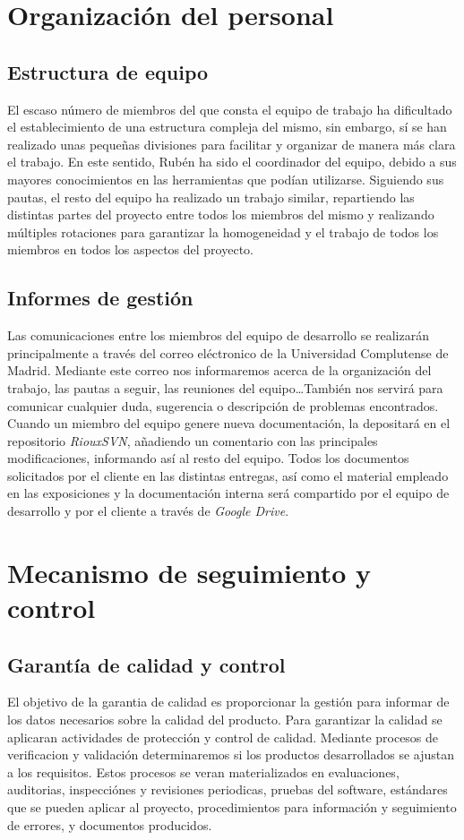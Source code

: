 \documentclass[11pt, a4paper, twoside]{report}
\begin{document}
	\section{Organización del personal}
		\subsection{Estructura de equipo}	%
		El escaso número de miembros del que consta el equipo de trabajo ha dificultado el establecimiento de una estructura compleja del mismo, sin embargo, sí se han realizado unas pequeñas divisiones para facilitar y organizar de manera más clara el trabajo. En este sentido, Rubén ha sido el coordinador del equipo, debido a sus mayores conocimientos en las herramientas que podían utilizarse. Siguiendo sus pautas, el resto del equipo ha realizado un trabajo similar, repartiendo las distintas partes del proyecto entre todos los miembros del mismo y realizando múltiples rotaciones para garantizar la homogeneidad y el trabajo de todos los miembros en todos los aspectos del proyecto.
		\subsection{Informes de gestión}
		Las comunicaciones entre los miembros del equipo de desarrollo se realizarán principalmente a través del correo eléctronico de la Universidad Complutense de Madrid. Mediante este correo nos informaremos acerca de la organización del trabajo, las pautas a seguir, las reuniones del equipo\ldots También nos servirá para comunicar cualquier duda, sugerencia o descripción de problemas encontrados. \\
		Cuando un miembro del equipo genere nueva documentación, la depositará en el repositorio \textit{RiouxSVN}, añadiendo un comentario con las principales modificaciones, informando así al resto del equipo. Todos los documentos solicitados por el cliente en las distintas entregas, así como el material empleado en las exposiciones y la documentación interna será compartido por el equipo de desarrollo y por el cliente a través de  \textit{Google Drive}.
	\section{Mecanismo de seguimiento y control}
		\subsection{Garantía de calidad y control}
		El objetivo de la garantia de calidad es proporcionar la gestión para informar de los datos necesarios sobre la calidad del producto. Para garantizar la calidad se aplicaran actividades de protección y control de calidad. Mediante procesos de verificacion y validación determinaremos si los productos desarrollados se ajustan a los requisitos. Estos procesos se veran materializados en evaluaciones, auditorias, inspecciónes y revisiones periodicas, pruebas del software, estándares que se pueden aplicar al proyecto, procedimientos para información y seguimiento de errores, y documentos producidos.
\end{document}
